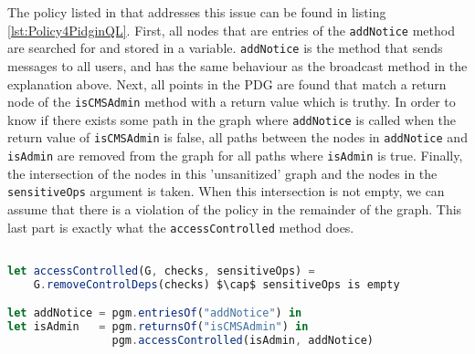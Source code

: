 The policy listed in \cite{PidginQLTechReport} that addresses this issue can be found in listing \ref{lst:Policy4PidginQL}. First, all nodes that are entries of the \texttt{addNotice} method are searched for and stored in a variable. \texttt{addNotice} is the method that sends messages to all users, and has the same behaviour as the broadcast method in the explanation above. Next, all points in the PDG are found that match a return node of the \texttt{isCMSAdmin} method with a return value which is truthy. In order to know if there exists some path in the graph where \texttt{addNotice} is called when the return value of \texttt{isCMSAdmin} is false, all paths between the nodes in \texttt{addNotice} and \texttt{isAdmin} are removed from the graph for all paths where \texttt{isAdmin} is true. Finally, the intersection of the nodes in this 'unsanitized' graph and the nodes in the \texttt{sensitiveOps} argument is taken. When this intersection is not empty, we can assume that there is a violation of the policy in the remainder of the graph. This last part is exactly what the \texttt{accessControlled} method does.

\begin{lstlisting}[label={lst:Policy4PidginQL},language=JavaScript,caption=Policy 4 in PidginQL,mathescape=true]  % float=t?

let accessControlled(G, checks, sensitiveOps) = 
    G.removeControlDeps(checks) $\cap$ sensitiveOps is empty

let addNotice = pgm.entriesOf("addNotice") in
let isAdmin   = pgm.returnsOf("isCMSAdmin") in 
                pgm.accessControlled(isAdmin, addNotice)
\end{lstlisting}

